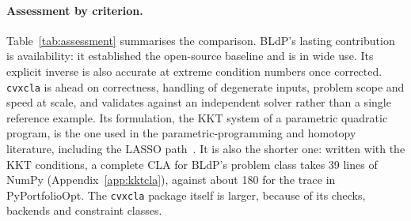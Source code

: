 \documentclass[11pt,a4paper]{article}
\newcommand{\code}[1]{\texttt{#1}}
\newcommand{\cvxcla}{\code{cvxcla}}
\begin{document}
\paragraph{Assessment by criterion.} Table~\ref{tab:assessment} summarises the
comparison. BLdP's lasting contribution is availability: it established the
open-source baseline and is in wide use. Its explicit inverse is also
accurate at extreme condition numbers once corrected. \cvxcla{} is ahead on
correctness, handling of degenerate inputs, problem scope and speed at scale,
and validates against an independent solver rather than a single reference
example. Its formulation, the KKT system of a parametric quadratic program, is
the one used in the parametric-programming and homotopy literature, including
the LASSO path~\cite{schmelzer2026}. It is also the shorter one: written with
the KKT conditions, a complete CLA for BLdP's problem class takes 39 lines of
NumPy (Appendix~\ref{app:kktcla}), against about 180 for the trace in
PyPortfolioOpt.
The \cvxcla{} package itself is larger, because of its checks, backends and
constraint classes.
\end{document}
